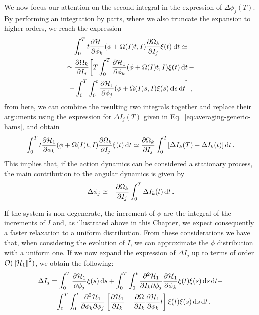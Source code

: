 We now focus our attention on the second integral in the expression of \(\Delta\phi_j(T)\). By performing an integration by parts, where we also truncate the expansion to higher orders, we reach the expression
\begin{multline}
	\int_0^T t\pdv{\mathcal{H}_1}{\phi_k}\/(\phi+\Omega(I)t,I)\pdv{\Omega_k}{I_j}\xi(t)\,\mathrm{d}t \simeq \\
	\simeq \pdv{\Omega_k}{I_j}\/\bigg[T\int_0^T\pdv{\mathcal{H}_1}{\phi_k}\/(\phi+\Omega(I)t,I)\xi(t)\,\mathrm{d}t\, - \\
	- \int_0^T\int_0^t\pdv{\mathcal{H}_1}{\phi_j}\/(\phi+\Omega(I)s, I)\xi(s)\,\mathrm{d}s\,\mathrm{d}t\bigg]\,,
\end{multline}
from here, we can combine the resulting two integrals together and replace their arguments using the expression for $\Delta I_j(T)$ given in Eq.~\eqref{eq:averaging-generic-hams}, and obtain
\begin{equation}
	\int_0^T t\pdv{\mathcal{H}_1}{\phi_k}\/(\phi+\Omega(I)t,I)\pdv{\Omega_k}{I_j}\xi(t)\,\mathrm{d}t \simeq \pdv{\Omega_k}{I_j}\int_0^T[\Delta I_k(T)-\Delta I_k(t)]\,\mathrm{d}t\,.
\end{equation}
This implies that, if the action dynamics can be considered a stationary process, the main contribution to the angular dynamics is given by
\begin{equation}
	\Delta \phi_j \simeq -\pdv{\Omega_k}{I_j}\int_0^T\Delta I_k(t)\,\mathrm{d}t\,.
\end{equation}

If the system is non-degenerate, %
the increment of $\phi$ are the integral of the increments of $I$ and, as illustrated above in this Chapter, we expect consequently a faster relaxation to a uniform distribution. From these considerations we have that, when considering the evolution of $I$, we can approximate the $\phi$ distribution with a uniform one. If we now expand the expression of $\Delta I_j$ up to terms of order \(\mathcal{O}(\norm{\mathcal{H}_1}^2)\), we obtain the following:
\begin{multline}
	\Delta I_j = \int_0^T \pdv{\mathcal{H}_1}{\phi_j}\xi(s)\,\mathrm{d}s + \int_0^T\int_0^t \pdv{\mathcal{H}_1}{I_k}{\phi_j}\pdv{\mathcal{H}_1}{\phi_k}\xi(t)\xi(s)\,\mathrm{d}s\,\mathrm{d}t - \\
	- \int_0^T\int_0^t\pdv{\mathcal{H}_1}{\phi_k}{\phi_j}\left[\pdv{\mathcal{H}_1}{I_k}-\pdv{\Omega}{I_k}\pdv{\mathcal{H}_1}{\phi_k}t\right]\xi(t)\xi(s)\,\mathrm{d}s\,\mathrm{d}t\,.
\end{multline}

